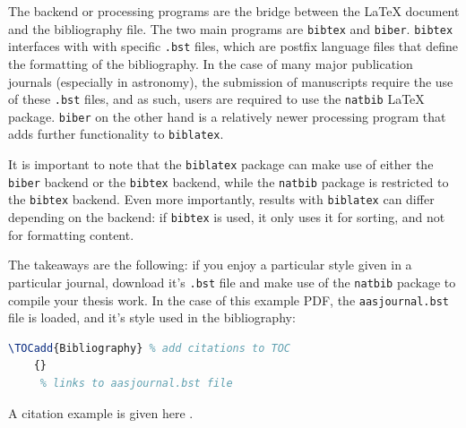 The backend or processing programs are the bridge between the LaTeX document and the bibliography file. The two main programs are \texttt{bibtex} and \texttt{biber}. \texttt{bibtex} interfaces with with specific \texttt{.bst} files, which are postfix language files that define the formatting of the bibliography. In the case of many major publication journals (especially in astronomy), the submission of manuscripts require the use of these \texttt{.bst} files, and as such, users are required to use the \texttt{natbib} LaTeX package. \texttt{biber} on the other hand is a relatively newer processing program that adds further functionality to \texttt{biblatex}.

It is important to note that the \texttt{biblatex} package can make use of either the \texttt{biber} backend or the \texttt{bibtex} backend, while the \texttt{natbib} package is restricted to the \texttt{bibtex} backend. Even more importantly, results with \texttt{biblatex} can differ depending on the backend: if \texttt{bibtex} is used, it only uses it for sorting, and not for formatting content.

The takeaways are the following: if you enjoy a particular style given in a particular journal, download it's \texttt{.bst} file and make use of the \texttt{natbib} package to compile your thesis work. In the case of this example PDF, the \texttt{aasjournal.bst} file is loaded, and it's style used in the bibliography:

\begin{lstlisting}[language=TeX]
    \TOCadd{Bibliography} % add citations to TOC
    {}
     % links to aasjournal.bst file
\end{lstlisting}

A citation example is given here \citep{Hubble1929}.

